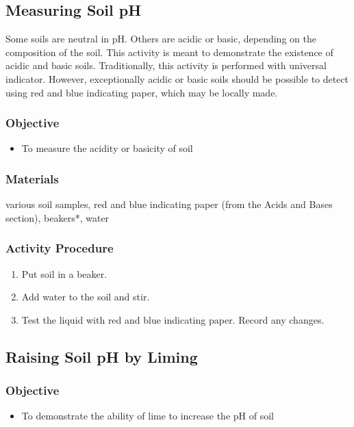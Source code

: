 \subsection{Measuring Soil pH}

Some soils are neutral in pH. Others are acidic or basic, depending on the composition of the soil. This activity is meant to demonstrate the existence of acidic and basic soils. Traditionally, this activity is performed with universal indicator. However, exceptionally acidic or basic soils should be possible to detect using red and blue indicating paper, which may be locally made.

\subsubsection{Objective}
\begin{itemize}
\item{To measure the acidity or basicity of soil}
\end{itemize}

\subsubsection{Materials}
various soil samples, red and blue indicating paper (from the Acids and Bases section), beakers*, water

\subsubsection{Activity Procedure}
\begin{enumerate}
\item{Put soil in a beaker.}
\item{Add water to the soil and stir.}
\item{Test the liquid with red and blue indicating paper. Record any changes.}
\end{enumerate}

\subsection{Raising Soil pH by Liming}

\subsubsection{Objective}
\begin{itemize}
\item{To demonstrate the ability of lime to increase the pH of soil}
\end{itemize}

